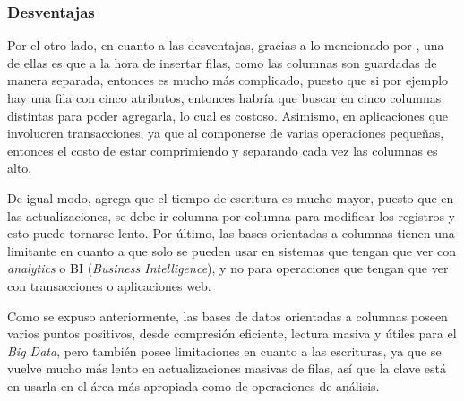  \subsubsection{Desventajas}

 Por el otro lado, en cuanto a las desventajas, gracias a lo mencionado por \textcite{viswanathan2020}, una de ellas es que a la hora de insertar filas, como las columnas son guardadas de manera separada, entonces es mucho más complicado, puesto que si por ejemplo hay una fila con cinco atributos, entonces habría que buscar en cinco columnas distintas para poder agregarla, lo cual es costoso. Asimismo, en aplicaciones que involucren transacciones, ya que al componerse de varias operaciones pequeñas, entonces el costo de estar comprimiendo y separando cada vez las columnas es alto.

 De igual modo, \textcite{viswanathan2020} agrega que el tiempo de escritura es mucho mayor, puesto que en las actualizaciones, se debe ir columna por columna para modificar los registros y esto puede tornarse lento. Por último, las bases orientadas a columnas tienen una limitante en cuanto a que solo se pueden usar en sistemas que tengan que ver con \textit{analytics} o BI (\textit{Business Intelligence}), y no para operaciones que tengan que ver con transacciones o aplicaciones web.

	 Como se expuso anteriormente, las bases de datos orientadas a columnas poseen varios puntos positivos, desde compresión eficiente, lectura masiva y útiles para el \textit{Big Data}, pero también posee limitaciones en cuanto a las escrituras, ya que se vuelve mucho más lento en actualizaciones masivas de filas, así que la clave está en usarla en el área más apropiada como de operaciones de análisis.
